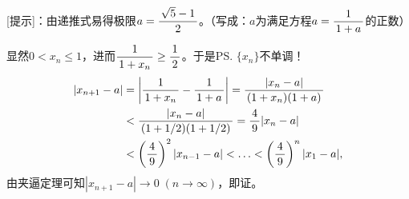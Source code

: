 [提示]：由递推式易得极限$a=\df{\sqrt5-1}2$。（写成：$a$为满足方程$a=\df1{1+a}$的正数）

显然$0<x_n\leq1$，进而$\df1{1+x_n}\geq\df12$。于是\ps{$\{x_n\}$不单调！}
\begin{align}
	|x_{n+1}-a|&=\left|\df1{1+x_n}-\df1{1+a}\right|=\df{|x_n-a|}{(1+x_n)(1+a)}\notag\\
	&<\df{|x_n-a|}{(1+1/2)(1+1/2)}=\df49|x_n-a|\notag\\
	&<\left(\df49\right)^2|x_{n-1}-a|<\ldots<\left(\df49\right)^{n}|x_1-a|,\notag
\end{align}
由夹逼定理可知$|x_{n+1}-a|\to0\;(n\to\infty)$，即证。

% 	
% 	
% 	
% 	
% 	
% 	
% 	
% 	
% 	

